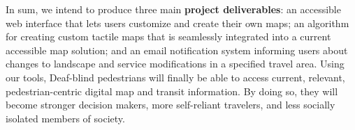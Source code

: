 In sum, we intend to produce three main \textbf{project deliverables}: an accessible web interface that lets users customize and create their own maps; an algorithm for creating custom tactile maps that is seamlessly integrated into a current accessible map solution; and an email notification system informing users about changes to landscape and service modifications in a specified travel area. Using our tools, Deaf-blind pedestrians will finally be able to access current, relevant, pedestrian-centric digital map and transit information. By doing so, they will become stronger decision makers, more self-reliant travelers, and less socially isolated members of society.

